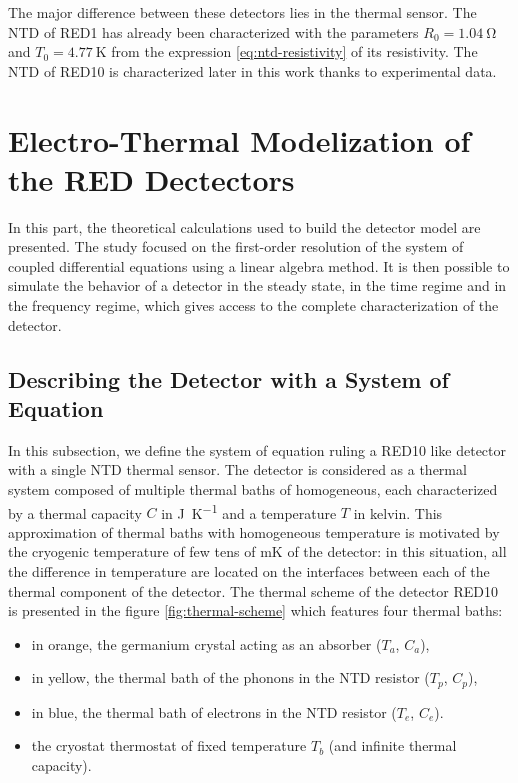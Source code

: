 The major difference between these detectors lies in the thermal sensor. The NTD of RED1 has already been characterized with the parameters $R_0 = \SI{1.04}{\ohm}$ and $T_0 = \SI{4.77}{\kelvin}$ from the expression \ref{eq:ntd-resistivity} of its resistivity.
The NTD of RED10 is characterized later in this work thanks to experimental data.

\section{Electro-Thermal Modelization of the RED Dectectors}

In this part, the theoretical calculations used to build the detector model are presented. The study focused on the first-order resolution of the system of coupled differential equations using a linear algebra method.
It is then possible to simulate the behavior of a detector in the steady state, in the time regime and in the frequency regime, which gives access to the complete characterization of the detector.

\subsection{Describing the Detector with a System of Equation}



In this subsection, we define the system of equation ruling a RED10 like detector with a single NTD thermal sensor. The detector is considered as a thermal system composed of multiple thermal baths of homogeneous, each characterized by a thermal capacity $C$ in \si{\joule\per\kelvin} and a temperature $T$ in \si{kelvin}.
This approximation of thermal baths with homogeneous temperature is motivated by the cryogenic temperature of few tens of \si{\milli\kelvin} of the detector: in this situation, all the difference in temperature are located on the interfaces between each of the thermal component of the detector.
The thermal scheme of the detector RED10 is presented in the figure \ref{fig:thermal-scheme} which features four thermal baths:
\begin{itemize}
\item in orange, the germanium crystal acting as an absorber ($T_a$, $C_a$),
\item in yellow, the thermal bath of the phonons in the NTD resistor ($T_p$, $C_p$),
\item in blue, the thermal bath of electrons in the NTD resistor ($T_e$, $C_e$).
\item the cryostat thermostat of fixed temperature $T_b$ (and infinite thermal capacity).
\end{itemize}

